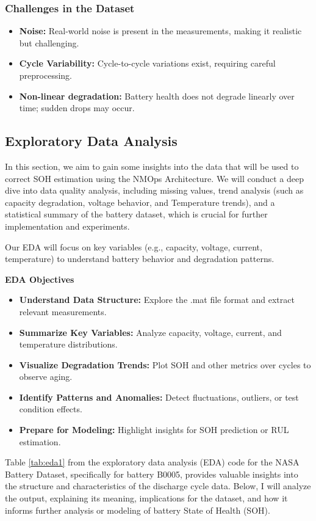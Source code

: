\subsubsection{Challenges in the Dataset}
\begin{itemize}
    \item \textbf{Noise:} Real-world noise is present in the measurements, making it realistic but challenging.
    \item \textbf{Cycle Variability:} Cycle-to-cycle variations exist, requiring careful preprocessing.
    \item \textbf{Non-linear degradation:} Battery health does not degrade linearly over time; sudden drops may occur.
\end{itemize}

\subsection{Exploratory Data Analysis}
In this section, we aim to gain some insights into the data that will be used to correct SOH estimation using the NMOps Architecture. We will conduct a deep dive into data quality analysis, including missing values, trend analysis (such as capacity degradation, voltage behavior, and Temperature trends), and a statistical summary of the battery dataset, which is crucial for further implementation and experiments. 

Our EDA will focus on key variables (e.g., capacity, voltage, current, temperature) to understand battery behavior and degradation patterns.

\textbf{EDA Objectives}
\begin{itemize}
    \item \textbf{Understand Data Structure:} Explore the .mat file format and extract relevant measurements.
    \item \textbf{Summarize Key Variables:} Analyze capacity, voltage, current, and temperature distributions.
    \item \textbf{Visualize Degradation Trends:} Plot SOH and other metrics over cycles to observe aging.
    \item \textbf{Identify Patterns and Anomalies:} Detect fluctuations, outliers, or test condition effects.
    \item \textbf{Prepare for Modeling:} Highlight insights for SOH prediction or RUL estimation.
\end{itemize}

Table \ref{tab:eda1} from the exploratory data analysis (EDA) code for the NASA Battery Dataset, specifically for battery B0005, provides valuable insights into the structure and characteristics of the discharge cycle data. Below, I will analyze the output, explaining its meaning, implications for the dataset, and how it informs further analysis or modeling of battery State of Health (SOH).

